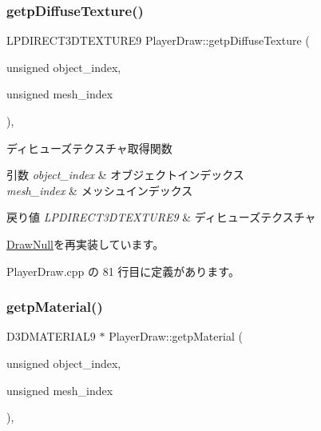 \subsubsection{\texorpdfstring{getp\+Diffuse\+Texture()}{getpDiffuseTexture()}}
{\footnotesize\ttfamily L\+P\+D\+I\+R\+E\+C\+T3\+D\+T\+E\+X\+T\+U\+R\+E9 Player\+Draw\+::getp\+Diffuse\+Texture (\begin{DoxyParamCaption}\item[{unsigned}]{object\+\_\+index,  }\item[{unsigned}]{mesh\+\_\+index }\end{DoxyParamCaption})\hspace{0.3cm}{\ttfamily [override]}, {\ttfamily [virtual]}}



ディヒューズテクスチャ取得関数 


\begin{DoxyParams}{引数}
{\em object\+\_\+index} & オブジェクトインデックス \\
\hline
{\em mesh\+\_\+index} & メッシュインデックス \\
\hline
\end{DoxyParams}

\begin{DoxyRetVals}{戻り値}
{\em L\+P\+D\+I\+R\+E\+C\+T3\+D\+T\+E\+X\+T\+U\+R\+E9} & ディヒューズテクスチャ \\
\hline
\end{DoxyRetVals}


\mbox{\hyperlink{class_draw_null_a98cc7cd43b19d9d70cc621d23d89286f}{Draw\+Null}}を再実装しています。



 Player\+Draw.\+cpp の 81 行目に定義があります。

\mbox{\label{class_player_draw_acb94ea7611a99698507321e44b7e9acb}} 
\subsubsection{\texorpdfstring{getp\+Material()}{getpMaterial()}}
{\footnotesize\ttfamily D3\+D\+M\+A\+T\+E\+R\+I\+A\+L9 $\ast$ Player\+Draw\+::getp\+Material (\begin{DoxyParamCaption}\item[{unsigned}]{object\+\_\+index,  }\item[{unsigned}]{mesh\+\_\+index }\end{DoxyParamCaption})\hspace{0.3cm}{\ttfamily [override]}, {\ttfamily [virtual]}}



